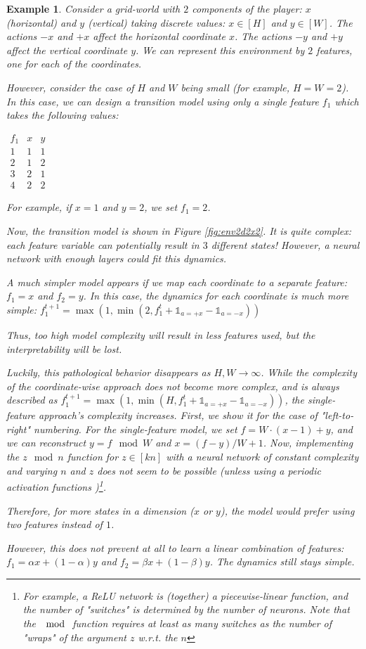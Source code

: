 \documentclass[a4paper,11pt,oneside]{report}
\newtheorem{example}{Example}[section]
\begin{document}
\begin{example}
    Consider a grid-world with $2$ components of the player: $x$ (horizontal) and $y$ (vertical) taking discrete values: $x\in [H]$ and $y\in [W]$. The actions $-x$ and $+x$ affect the horizontal coordinate $x$. The actions $-y$ and $+y$ affect the vertical coordinate $y$. We can represent this environment by $2$ features, one for each of the coordinates.

    However, consider the case of $H$ and $W$ being small (for example, $H=W=2$). In this case, we can design a transition model using only a single feature $f_1$ which takes the following values:

    $
    \begin{array}{ccc}
        f_1 & x & y \\
        1 & 1 & 1 \\
        2 & 1 & 2 \\
        3 & 2 & 1 \\
        4 & 2 & 2
    \end{array}
    $

    For example, if $x=1$ and $y=2$, we set $f_1=2$.

    Now, the transition model is shown in Figure \ref{fig:env2d2x2}. It is quite complex: each feature variable can potentially result in $3$ different states! However, a neural network with enough layers could fit this dynamics.

    A much simpler model appears if we map each coordinate to a separate feature: $f_1=x$ and $f_2=y$. In this case, the dynamics for each coordinate is much more simple:
    $f_1^{t+1}=\max(1, \min(2, f_1^t+\mathds 1_{a=+x}-\mathds 1_{a=-x}))$

    Thus, too high model complexity will result in less features used, but the interpretability will be lost.

    Luckily, this pathological behavior disappears as $H, W\to\infty$. While the complexity of the coordinate-wise approach does {\em not} become more complex, and is always described as $f_1^{t+1}=\max(1, \min(H, f_1^t+\mathds 1_{a=+x}-\mathds 1_{a=-x}))$, the single-feature approach's complexity increases. First, we show it for the case of "left-to-right" numbering.
    For the single-feature model, we set $f=W\cdot (x - 1)+y$, and we can reconstruct $y=f\mod W$ and $x=(f-y)/W+1$.
    Now, implementing the $z\mod n$ function for $z\in [kn]$ with a neural network of constant complexity and varying $n$ and $z$ does not seem to be possible (unless using a periodic activation functions \cite{Sitzmann2020})\footnote{For example, a ReLU network is (together) a piecewise-linear function, and the number of "switches" is determined by the number of neurons. Note that the $\mod$ function requires at least as many switches as the number of "wraps" of the argument $z$ w.r.t. the $n$}.

    Therefore, for more states in a dimension ($x$ or $y$), the model would prefer using two features instead of $1$.

    However, this does not prevent at all to learn a linear combination of features: $f_1=\alpha x+(1-\alpha)y$ and $f_2=\beta x+(1-\beta)y$. The dynamics still stays simple.
\end{example}
\end{document}
